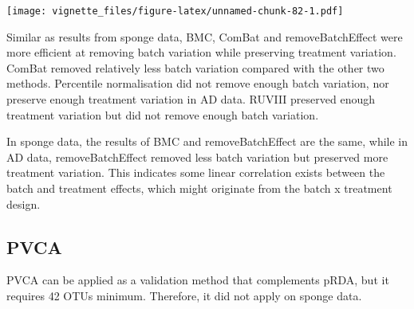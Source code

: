 \documentclass[]{book}
\begin{document}
\texttt{[image: vignette\_files/figure-latex/unnamed-chunk-82-1.pdf]}

Similar as results from sponge data, BMC, ComBat and removeBatchEffect
were more efficient at removing batch variation while preserving
treatment variation. ComBat removed relatively less batch variation
compared with the other two methods. Percentile normalisation did not
remove enough batch variation, nor preserve enough treatment variation
in AD data. RUVIII preserved enough treatment variation but did not
remove enough batch variation.

In sponge data, the results of BMC and removeBatchEffect are the same,
while in AD data, removeBatchEffect removed less batch variation but
preserved more treatment variation. This indicates some linear
correlation exists between the batch and treatment effects, which might
originate from the batch x treatment design.

\subsection{PVCA}\label{pvca}

PVCA can be applied as a validation method that complements pRDA, but it
requires 42 OTUs minimum. Therefore, it did not apply on sponge data.
\end{document}
